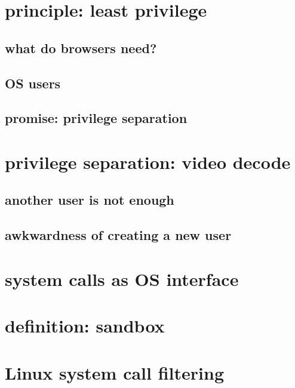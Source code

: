 

\section{principle: least privilege}


\subsection{what do browsers need?}


\subsection{OS users}


\subsection{promise: privilege separation}


\section{privilege separation: video decode}


\subsection{another user is not enough}


\subsection{awkwardness of creating a new user}


\section{system calls as OS interface}


\section{definition: sandbox}


\section{Linux system call filtering}
